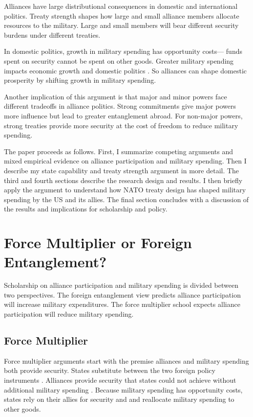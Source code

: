 \documentclass[12pt]{article}
\begin{document}
Alliances have large distributional consequences in domestic and international politics.
Treaty strength shapes how large and small alliance members allocate resources to the military. 
Large and small members will bear different security burdens under different treaties.


In domestic politics, growth in military spending has opportunity costs--- funds spent on security cannot be spent on other goods. 
Greater military spending impacts economic growth \citep{ShinWard1999, AlptekinLevine2012} and domestic politics \citep{Narizny2003, WhittenWilliams2011, Williams2015}.
So alliances can shape domestic prosperity by shifting growth in military spending. 


Another implication of this argument is that major and minor powers face different tradeoffs in alliance politics.
Strong commitments give major powers more influence but lead to greater entanglement abroad.
For non-major powers, strong treaties provide more security at the cost of freedom to reduce military spending. 


The paper proceeds as follows. 
First, I summarize competing arguments and mixed empirical evidence on alliance participation and military spending. 
Then I describe my state capability and treaty strength argument in more detail. 
The third and fourth sections describe the research design and results. 
I then briefly apply the argument to understand how NATO treaty design has shaped military spending by the US and its allies. 
The final section concludes with a discussion of the results and implications for scholarship and policy.  


\section{Force Multiplier or Foreign Entanglement?}


Scholarship on alliance participation and military spending is divided between two perspectives. 
The foreign entanglement view predicts alliance participation will increase military expenditures.
The force multiplier school expects alliance participation will reduce military spending. 


\subsection{Force Multiplier} 


Force multiplier arguments start with the premise alliances and military spending both provide security.
States substitute between the two foreign policy instruments \citep{MostStarr1989}.  
Alliances provide security that states could not achieve without additional military spending \citep{Morrow1993, Conybeare1994}. 
Because military spending has opportunity costs, states rely on their allies for security and and reallocate military spending to other goods. 
\end{document}
